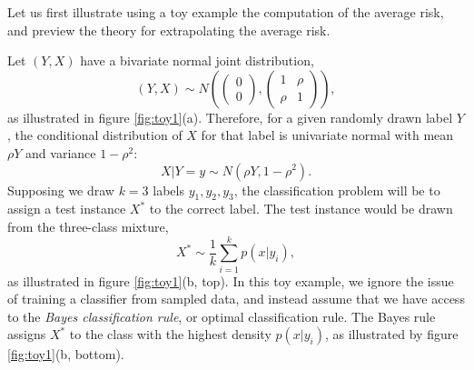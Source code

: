 \documentclass[12pt]{article}
\begin{document}
Let us first illustrate using a toy example the computation of the
average risk, and preview the theory for extrapolating the average
risk.

Let $(Y, X)$ have a bivariate normal joint distribution,
\[
(Y, X) \sim N\left(\begin{pmatrix}0 \\0\end{pmatrix}, \begin{pmatrix}1 & \rho \\ \rho & 1\end{pmatrix}\right),
\]
as illustrated in figure \ref{fig:toy1}(a).
Therefore, for a given randomly drawn label $Y$, the conditional
distribution of $X$ for that label is univariate normal with mean $\rho Y$ and variance $1-\rho^2$:
\[
X|Y = y \sim N(\rho Y, 1-\rho^2).
\]
Supposing we draw $k = 3$ labels $y_1,y_2, y_3$, the classification
problem will be to assign a test instance $X^*$ to the correct label.
The test instance would be drawn from the three-class mixture,
\[
X^* \sim \frac{1}{k}\sum_{i=1}^k p(x|y_i),
\]
as illustrated in figure \ref{fig:toy1}(b, top).  In this toy example, we
ignore the issue of training a classifier from sampled data, and
instead assume that we have access to the \emph{Bayes classification
rule}, or optimal classification rule.  The Bayes rule assigns $X^*$
to the class with the highest density $p(x|y_i)$, as illustrated by
figure \ref{fig:toy1}(b, bottom).
\end{document}
